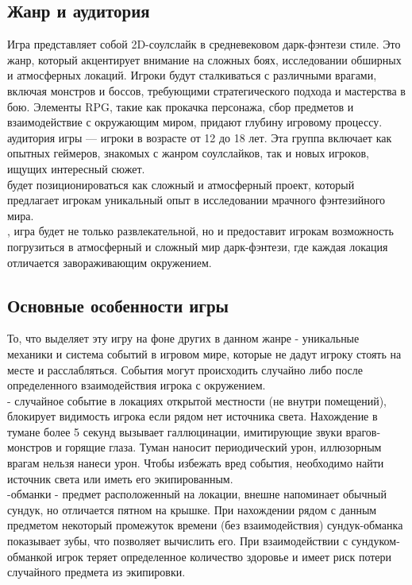 \documentclass{article}
\begin{document}
\subsection{Жанр и аудитория}
Игра представляет собой 2D-соулслайк в средневековом дарк-фэнтези стиле. Это жанр, который акцентирует внимание на сложных боях, исследовании обширных и атмосферных локаций. Игроки будут сталкиваться с различными врагами, включая монстров и боссов, требующими стратегического подхода и мастерства в бою. Элементы RPG, такие как прокачка персонажа, сбор предметов и взаимодействие с окружающим миром, придают глубину игровому процессу.\\[2mm]  аудитория игры — игроки в возрасте от 12 до 18 лет. Эта группа включает как опытных геймеров, знакомых с жанром соулслайков, так и новых игроков, ищущих интересный сюжет.\\[2mm]  будет позиционироваться как сложный и атмосферный проект, который предлагает игрокам уникальный опыт в исследовании мрачного фэнтезийного мира.  \\[2mm] , игра будет не только развлекательной, но и предоставит игрокам возможность погрузиться в атмосферный и сложный мир дарк-фэнтези, где каждая локация отличается завораживающим окружением.

\subsection{Основные особенности игры}
То, что выделяет эту игру на фоне других в данном жанре - уникальные механики и система событий в игровом мире, которые не дадут игроку стоять на месте и расслабляться. События могут происходить случайно либо после определенного взаимодействия игрока с окружением. \\[2mm]  - случайное событие в локациях открытой местности (не внутри помещений), блокирует видимость игрока если рядом нет источника света. Нахождение в тумане более 5 секунд вызывает галлюцинации, имитирующие звуки врагов-монстров и горящие глаза. Туман наносит периодический урон, иллюзорным врагам нельзя нанеси урон. Чтобы избежать вред события, необходимо найти источник света или иметь его экипированным. \\[2mm] -обманки - предмет расположенный на локации, внешне напоминает обычный сундук, но отличается пятном на крышке. При нахождении рядом с данным предметом  некоторый промежуток времени (без взаимодействия) сундук-обманка показывает зубы, что позволяет вычислить его. При взаимодействии с сундуком-обманкой игрок теряет определенное количество здоровье и имеет риск потери случайного предмета из экипировки. \\[2mm] 
\end{document}
